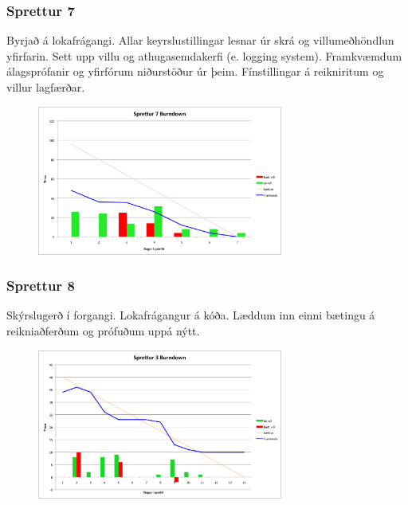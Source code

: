 \documentclass{article}
\begin{document}
\subsubsection{Sprettur 7}
Byrjað á lokafrágangi. Allar keyrslustillingar lesnar úr skrá og villumeðhöndlun
yfirfarin. Sett upp villu og athugasemdakerfi (e. logging system). Framkvæmdum álagsprófanir og 
yfirfórum niðurstöður úr þeim. Fínstillingar á reikniritum og villur lagfærðar. 

\begin{figure}[H]
 \centering
 \includegraphics[width=0.72\textwidth]{Sprettur7_Burndown.png}
 \caption{}
\end{figure}

\subsubsection{Sprettur 8}
Skýrslugerð í forgangi. Lokafrágangur á kóða. Læddum inn einni
bætingu á reikniaðferðum og prófuðum uppá nýtt.
\begin{figure}[H]
 \centering
 \includegraphics[width=0.72\textwidth]{Sprettur3_Burndown.png}
 \caption{}
\end{figure}

\hfil \\
\hfil \\
\hfil \\
\hfil \\
\end{document}
